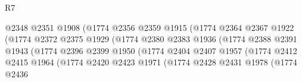 \begin{lexlean}{R7}
\begin{coremodule}
                                          @2348
                                          @2351
                                          @1908
                                          (@1774
                                            @2356
                                            @2359
                                            @1915
                                            (@1774
                                              @2364
                                              @2367
                                              @1922
                                              (@1774
                                                @2372
                                                @2375
                                                @1929
                                                (@1774
                                                  @2380
                                                  @2383
                                                  @1936
                                                  (@1774
                                                    @2388
                                                    @2391
                                                    @1943
                                                    (@1774
                                                      @2396
                                                      @2399
                                                      @1950
                                                      (@1774
                                                        @2404
                                                        @2407
                                                        @1957
                                                        (@1774
                                                          @2412
                                                          @2415
                                                          @1964
                                                          (@1774
                                                            @2420
                                                            @2423
                                                            @1971
                                                            (@1774
                                                              @2428
                                                              @2431
                                                              @1978
                                                              (@1774
                                                                @2436

\end{coremodule}
\end{lexlean}
